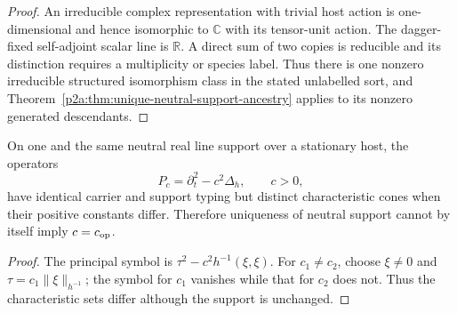 \documentclass[12pt,a4paper]{article}
\begin{document}
\begin{proof}
An irreducible complex representation with trivial host action is
one-dimensional and hence isomorphic to \(\mathbb C\) with its tensor-unit
action.  The dagger-fixed self-adjoint scalar line is \(\mathbb R\).  A direct
sum of two copies is reducible and its distinction requires a multiplicity or
species label.  Thus there is one nonzero irreducible structured isomorphism
class in the stated unlabelled sort, and
Theorem~\ref{p2a:thm:unique-neutral-support-ancestry} applies to its nonzero
generated descendants.
\end{proof}

\begin{proposition}
\label{p2a:prop:neutral-support-speed-countermodel}
On one and the same neutral real line support over a stationary host, the
operators
\[
 P_c=\partial_t^2-c^2\Delta_h,
 \qquad c>0,
\]
have identical carrier and support typing but distinct characteristic cones
when their positive constants differ.  Therefore uniqueness of neutral support
cannot by itself imply \(c=c_{\rm op}\).
\end{proposition}

\begin{proof}
The principal symbol is
\(\tau^2-c^2h^{-1}(\xi,\xi)\).  For \(c_1\ne c_2\), choose
\(\xi\ne0\) and \(\tau=c_1\|\xi\|_{h^{-1}}\); the symbol for \(c_1\)
vanishes while that for \(c_2\) does not.  Thus the characteristic sets differ
although the support is unchanged.
\end{proof}
\end{document}
